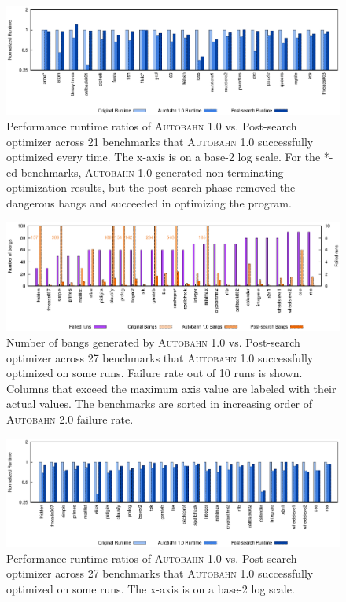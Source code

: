 \documentclass[format=sigplan, review=true, 9pt]{acmart}
\newcommand{\scaption}[1]{\caption{#1}}
\newcommand{\dangerous}[0]{dangerous}
\newcommand{\Ao}[0]{\textsc{Autobahn 1.0}}
\newcommand{\At}[0]{\textsc{Autobahn 2.0}}
\newcommand{\postopt}[0]{post-search}
\newcommand{\Postopt}[0]{Post-search}
\begin{document}
\begin{figure}
\includegraphics[width=\textwidth]{aut-post}
\scaption{Performance runtime ratios of \Ao{} vs. \Postopt{} optimizer
across 21 benchmarks that \Ao{} successfully
optimized every time. The x-axis is on a base-2 log scale.
For the *-ed benchmarks, \Ao{} generated non-terminating
optimization results, but the \postopt{} phase removed
the \dangerous{} bangs and succeeded in optimizing the program. }
\label{fig:post-ratio-all}
\end{figure}

\begin{figure}
\includegraphics[width=\textwidth]{ap-partial-bangs}
\scaption{Number of bangs generated by \Ao{} vs. \Postopt{} optimizer
across 27 benchmarks that \Ao{} successfully optimized on some runs. Failure rate
out of 10 runs is shown. Columns that exceed 
the maximum axis value are labeled with their actual values. 
The benchmarks are sorted in increasing order of \At{} failure rate. } 
\label{fig:post-bangs-some}
\end{figure}

\begin{figure}
\includegraphics[width=\textwidth]{ap-partial}
\scaption{Performance runtime ratios of \Ao{} vs. \Postopt{} optimizer
across 27 benchmarks that \Ao{} successfully optimized on some runs.
The x-axis is on a base-2 log scale. 
}
\label{fig:post-ratio-some}
\end{figure}
\end{document}
